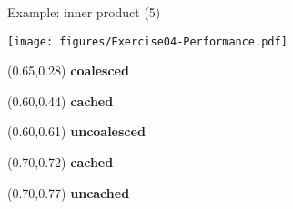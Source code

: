 \begin{frame}[fragile]{Example: inner product (5)}

  \vspace{-10pt}

    \texttt{[image: figures/Exercise04-Performance.pdf]}

  \vspace{-15pt}

  \begin{textblock*}{0.5\textwidth}(0.65\textwidth,0.28\textheight)
    \textbf{coalesced}
  \end{textblock*}

  \begin{textblock*}{0.5\textwidth}(0.60\textwidth,0.44\textheight)
    \textbf{cached}
  \end{textblock*}

  \begin{textblock*}{0.5\textwidth}(0.60\textwidth,0.61\textheight)
    \textbf{uncoalesced}
  \end{textblock*}

  \begin{textblock*}{0.5\textwidth}(0.70\textwidth,0.72\textheight)
    \textbf{cached}
  \end{textblock*}

  \begin{textblock*}{0.5\textwidth}(0.70\textwidth,0.77\textheight)
    \textbf{uncached}
  \end{textblock*}

\end{frame}


